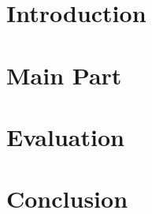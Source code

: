 \documentclass[paper=a4,draft=false]{scrartcl}
\begin{document}

\tableofcontents

\begin{abstract}
\end{abstract}

\section{Introduction}\label{sec:introduction}


\section{Main Part}\label{sec:main_part}


\section{Evaluation}\label{sec:evaluation}


\section{Conclusion}\label{sec:conclusion}


\appendix




\end{document}
